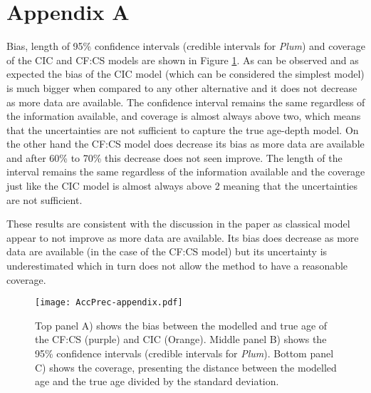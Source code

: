 \documentclass [10pt] {article}
\begin{document}
\section{Appendix A}

Bias, length of 95\% confidence intervals (credible intervals for \textit{Plum}) and coverage of the CIC and CF:CS models are shown in Figure \ref{fig:CIC-CFCS}.
As can be observed and as expected the bias of the CIC model (which can be considered the simplest model) is much bigger when compared to any other alternative and it does not decrease as more data are available.
The confidence interval remains the same regardless of the information available, and coverage is almost always above two, which means that the uncertainties are not sufficient to capture the true age-depth model.
On the other hand the CF:CS model does decrease its bias as more data are available and after 60\% to 70\% this decrease does not seen improve.
The length of the interval remains the same regardless of the information available and the coverage just like the CIC model is almost always above 2 meaning that the uncertainties are not sufficient.

These results are consistent with the discussion in the paper as classical model appear to not improve as more data are available.
Its bias does decrease as more data are available (in the case of the CF:CS model) but its uncertainty is underestimated which in turn does not allow the method to have a reasonable coverage. 


\begin{figure}
	\begin{centering}
		\texttt{[image: AccPrec-appendix.pdf]}
		\caption{ Top panel A) shows the bias between the modelled and true age of the CF:CS (purple) and CIC (Orange). Middle panel B) shows the 95\% confidence intervals (credible intervals for \textit{Plum}). Bottom panel C) shows the coverage, presenting the distance between the modelled age and the true age divided by the standard deviation. }
		\label{fig:CIC-CFCS}
	\end{centering}
\end{figure}
\end{document}
